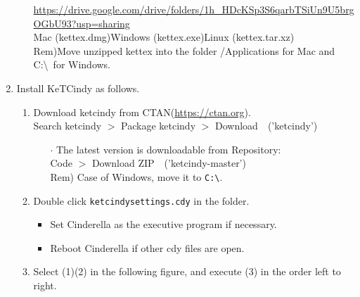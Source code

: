 \documentclass{article}
\begin{document}
\begin{enumerate}[\bf\large 1.]
\begin{enumerate}[(1)]
\hspace*{3mm}\url{https://drive.google.com/drive/folders/1h_HDcKSp3S6qarbTSiUn9U5brgOGbU93?usp=sharing}\\
\hspace*{12mm}Mac (kettex.dmg)\hspace{3mm}Windows (kettex.exe)\hspace*{3mm}Linux (kettex.tar.xz)\\
\hspace*{3mm}Rem)Move unzipped kettex into the folder /Applications for Mac and C:\textbackslash\ for Windows.
 \end{enumerate}

\item Install KeTCindy as follows.\vspace{-1mm}
  \begin{enumerate}[(1)]
  \item Download ketcindy from CTAN(\url{https://ctan.org}).\\
  \hspace*{10mm}Search ketcindy $>$ Pack­age ketcindy $>$ Download\ \ ('ketcindy')\vspace{-1mm}
    \begin{itemize}
    \item[$\cdot$]The {\color{red}latest version} is downloadable from Repository:\\
         \hspace*{10mm}Code $>$ Download ZIP\ \ ('ketcindy-master')\\
        \hspace*{5mm}Rem) Case of Windows, move it to \verb|C:\|.\vspace{-1mm}
    \end{itemize}
  \item Double click \verb|ketcindysettings.cdy| in the folder.\vspace{-1mm}
    \begin{itemize}
    \item Set Cinderella as the executive program if necessary.\vspace{-1mm}
    \item Reboot Cinderella if other cdy files are open.\vspace{-1mm}
   \end{itemize}
  \item Select (1)(2) in the following figure, and execute (3) in the order left to right.
  \end{enumerate}


\end{enumerate}
\end{document}

